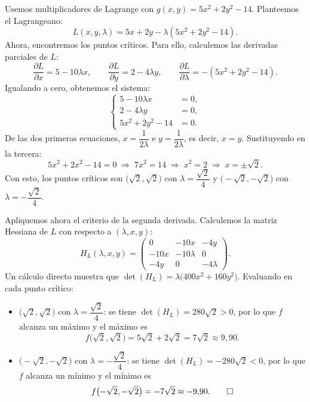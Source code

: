 \documentclass[11pt,respuestas,a4]{aleph-examen}
\begin{document}
\begin{preguntas}
\begin{respuesta}
Usemos multiplicadores de Lagrange con $g(x,y) = 5x^2 + 2y^2 - 14$. Planteemos el Lagrangeano:
\[
    L(x,y,\lambda) = 5x + 2y - \lambda(5x^2 + 2y^2 - 14).
\]
Ahora, encontremos los puntos críticos. Para ello, calculemos las derivadas parciales de $L$:
\[
    \frac{\partial L}{\partial x} = 5 - 10\lambda x,
    \qquad
    \frac{\partial L}{\partial y} = 2 - 4\lambda y,
    \qquad
    \frac{\partial L}{\partial \lambda} = -(5x^2 + 2y^2 - 14).
\]
Igualando a cero, obtenemos el sistema:
\[
    \left\{
    \begin{aligned}
        5 - 10\lambda x &= 0,\\
        2 - 4\lambda y &= 0,\\
        5x^2 + 2y^2 - 14 &= 0.
    \end{aligned}
    \right.
\]
De las dos primeras ecuaciones, $x = \dfrac{1}{2\lambda}$ e $y = \dfrac{1}{2\lambda}$, es decir, $x = y$. Sustituyendo en la tercera:
\[
    5x^2 + 2x^2 - 14 = 0
    \;\Longrightarrow\;
    7x^2 = 14
    \;\Longrightarrow\;
    x^2 = 2
    \;\Longrightarrow\;
    x = \pm\sqrt{2}.
\]
Con esto, los puntos críticos son $\bigl(\sqrt{2},\sqrt{2}\bigr)$ con $\lambda = \dfrac{\sqrt{2}}{4}$ y $\bigl(-\sqrt{2},-\sqrt{2}\bigr)$ con $\lambda = -\dfrac{\sqrt{2}}{4}$.

Apliquemos ahora el criterio de la segunda derivada. Calculemos la matriz Hessiana de $L$ con respecto a $(\lambda, x, y)$:
\[
    H_L(\lambda,x,y)
    =
    \begin{pmatrix}
        0 & -10x & -4y\\[4pt]
        -10x & -10\lambda & 0\\[4pt]
        -4y & 0 & -4\lambda
    \end{pmatrix}.
\]
Un cálculo directo muestra que $\det(H_L) = \lambda\bigl(400x^2 + 160y^2\bigr)$. Evaluando en cada punto crítico:
\begin{itemize}
    \item {$\bigl(\sqrt{2},\sqrt{2}\bigr)$ con $\lambda = \dfrac{\sqrt{2}}{4}$:} se tiene $\det(H_L) = 280\sqrt{2} > 0$, por lo que $f$ alcanza un {máximo} y el máximo es
    \[
        f\bigl(\sqrt{2},\sqrt{2}\bigr) = 5\sqrt{2} + 2\sqrt{2} = 7\sqrt{2} \approx 9{,}90.
    \]
    \item {$\bigl(-\sqrt{2},-\sqrt{2}\bigr)$ con $\lambda = -\dfrac{\sqrt{2}}{4}$:} se tiene $\det(H_L) = -280\sqrt{2} < 0$, por lo que $f$ alcanza un {mínimo} y el mínimo es
    \[
        f\bigl(-\sqrt{2},-\sqrt{2}\bigr) = -7\sqrt{2} \approx -9{,}90.\qedhere
    \]
\end{itemize}
\end{respuesta}



\end{preguntas}
\end{document}
